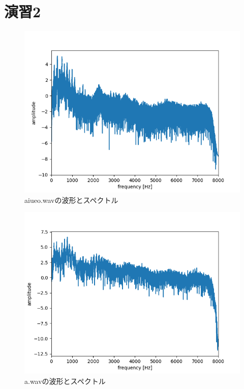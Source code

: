\documentclass[11pt,a4j]{jarticle}%
\begin{document}
\section*{演習2}
\begin{figure}[H]
  \centering
  \includegraphics[width=120mm]{img/aiueo-plot-spectrum-whole.png}
  \caption{aiueo.wavの波形とスペクトル}
\end{figure}

\begin{figure}[H]
  \centering
  \includegraphics[width=120mm]{img/a-plot-spectrum-whole.png}
  \caption{a.wavの波形とスペクトル}
\end{figure}
\end{document}
